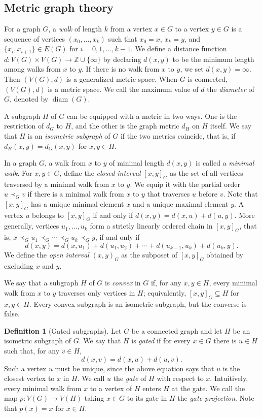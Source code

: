 \documentclass{amsart}
\numberwithin{equation}{section}
\theoremstyle{plain}
\theoremstyle{remark}
\theoremstyle{definition}
\newtheorem{defn}[thm]{Definition}
\numberwithin{equation}{section}
\newcommand{\Z}{\mathbb{Z}}
\DeclareMathOperator{\diam}{diam}
\begin{document}
\subsection{Metric graph theory}\label{basicdef} 
For a graph $G$, a \emph{walk} of length $k$ from a vertex $x\in G$ to a vertex $y\in G$ is a sequence of vertices $(x_0,\ldots,x_k)$ such that $x_0=x$, $x_k=y$, and $\{x_i,x_{i+1}\}\in E(G)$ for $i=0,1,\ldots,k-1$. We define a distance function $d:V(G)\times V(G)\to \Z\cup\{\infty\}$ by declaring $d(x,y)$ to be the minimum length among walks from $x$ to $y$. If there is no walk from $x$ to $y$, we set $d(x,y)=\infty$. Then $(V(G),d)$ is a generalized metric space. When $G$ is connected, $(V(G),d)$ is a metric space. We call the maximum value of $d$ the \emph{diameter} of $G$, denoted by $\diam(G)$.

A subgraph $H$ of $G$ can be equipped with a metric in two ways. One is the restriction of $d_G$ to $H$, and the other is the graph metric $d_H$ on $H$ itself. We say that $H$ is an \emph{isometric subgraph} of $G$ if the two metrics coincide, that is, if $d_H(x,y)=d_G(x,y)$ for $x,y\in H$.

In a graph $G$, a walk from $x$ to $y$ of minimal length $d(x,y)$ is called a \emph{minimal walk}. For $x,y\in G$, define the \emph{closed interval} $[x,y]_G$ as the set of all vertices traversed by a minimal walk from $x$ to $y$. We equip it with the partial order $u\prec_G v$ if there is a minimal walk from $x$ to $y$ that traverses $u$ before $v$. Note that $[x,y]_G$ has a unique minimal element $x$ and a unique maximal element $y$. A vertex $u$ belongs to $[x,y]_G$ if and only if $d(x,y)=d(x,u)+d(u,y)$. More generally, vertices $u_1,\ldots,u_k$ form a strictly linearly ordered chain in $[x,y]_G$, that is, $x\prec_G u_1\prec_G\cdots\prec_G u_k\prec_G y$, if and only if 
\begin{equation}
    d(x,y)=d(x,u_1)+d(u_1,u_2)+\cdots+d(u_{k-1},u_k)+d(u_k,y).\label{linearlyorderedchain}
\end{equation}
We define the \emph{open interval} $(x,y)_G$ as the subposet of $[x,y]_G$ obtained by excluding $x$ and $y$.

We say that a subgraph $H$ of $G$ is \emph{convex} in $G$ if, for any $x,y\in H$, every minimal walk from $x$ to $y$ traverses only vertices in $H$; equivalently, $[x,y]_G\subseteq H$ for $x,y\in H$. Every convex subgraph is an isometric subgraph, but the converse is false.

\begin{defn}[Gated subgraphs]\label{gated}
    Let $G$ be a connected graph and let $H$ be an isometric subgraph of $G$. We say that $H$ is \emph{gated} if for every $x\in G$ there is $u\in H$ such that, for any $v\in H$,
    \[
    d(x,v)=d(x,u)+d(u,v).
    \]
    Such a vertex $u$ must be unique, since the above equation says that $u$ is the closest vertex to $x$ in $H$. We call $u$ the \emph{gate} of $H$ with respect to $x$. Intuitively, every minimal walk from $x$ to a vertex of $H$ enters $H$ at the gate.
    We call the map $p:V(G)\to V(H)$ taking $x\in G$ to its gate in $H$ the \emph{gate projection}. Note that $p(x)=x$ for $x\in H$.
\end{defn}
\end{document}
